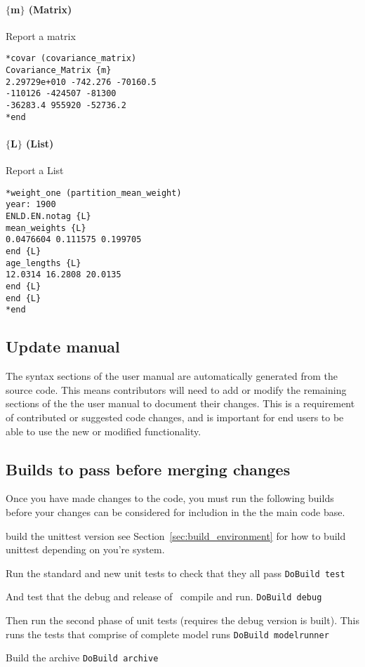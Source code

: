 \paragraph*{$\{$m$\}$ (Matrix)}
Report a matrix
{\small{\begin{verbatim}
*covar (covariance_matrix)
Covariance_Matrix {m}
2.29729e+010 -742.276 -70160.5
-110126 -424507 -81300 
-36283.4 955920 -52736.2 
*end
\end{verbatim}}}

\paragraph*{$\{$L$\}$ (List)}
Report a List
{\small{\begin{verbatim}
*weight_one (partition_mean_weight)
year: 1900
ENLD.EN.notag {L}
mean_weights {L}
0.0476604 0.111575 0.199705
end {L}
age_lengths {L}
12.0314 16.2808 20.0135
end {L}
end {L}
*end
\end{verbatim}}}

\subsection{Update manual}
The syntax sections of the user manual are automatically generated from the source code. This means contributors will need to add or modify the remaining sections of the the user manual to document their changes. This is a requirement of contributed or suggested code changes, and is important for end users to be able to use the new or modified functionality.

\subsection{Builds to pass before merging changes}

Once you have made changes to the code, you must run the following builds before your changes can be considered for includion in the the main code base.

build the unittest version see Section~\ref{sec:build_environment} for how to build unittest depending on you're system.

Run the standard and new unit tests to check that they all pass
\texttt{DoBuild test}

And test that the debug and release of \CNAME\ compile and run.
\texttt{DoBuild debug}

Then run the second phase of unit tests (requires the debug version is built). This runs the tests that comprise of complete model runs
\texttt{DoBuild modelrunner}

Build the archive 
\texttt{DoBuild archive}


